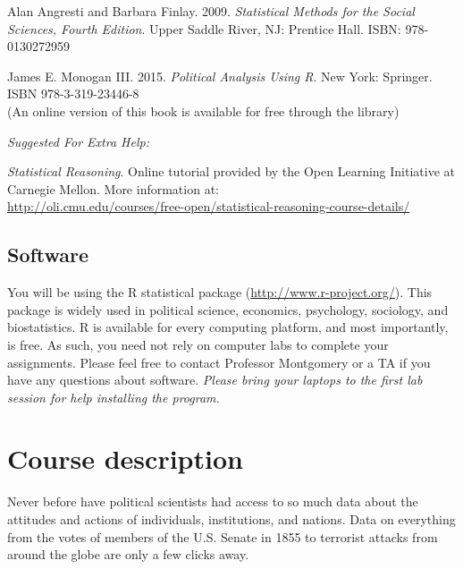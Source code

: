 \documentclass[11pt]{article}
\begin{document}
\vspace{.2cm}
\noindent Alan Angresti and Barbara Finlay.  2009.
\textit{Statistical Methods for the Social Sciences, Fourth Edition}.
Upper Saddle River, NJ: Prentice Hall.  ISBN: 978-0130272959

\vspace{.2cm}

\noindent James E. Monogan III. 2015. \textit{Political Analysis Using R}. New
York: Springer. \\ISBN 978-3-319-23446-8 \\ (An online version of this
book is available for free through the library)


\vspace{.4cm}

\noindent \textit{Suggested For Extra Help:}
\vspace{.2cm}

\noindent \textit{Statistical Reasoning}.  Online tutorial provided by the
Open Learning Initiative at Carnegie Mellon.  More information at:\\
\url{http://oli.cmu.edu/courses/free-open/statistical-reasoning-course-details/}

\vspace{.2cm}


\subsection*{Software}

You will be using the R statistical package
(\url{http://www.r-project.org/}). This package is widely used in
political science, economics, psychology, sociology, and
biostatistics. R is available for every computing platform, and most
importantly, is free. As such, you need not rely on computer labs to
complete your assignments. Please feel free to contact Professor
Montgomery or a TA if you have any questions about software.
\textit{Please bring your laptops to the first lab session for help
  installing the program.}


\newpage

\section*{Course description}


Never before have political scientists had access to so much data
about the attitudes and actions of individuals, institutions, and
nations.  Data on everything from the votes of members of the
U.S. Senate in 1855 to terrorist attacks from around the globe are
only a few clicks away.
 
\end{document}
